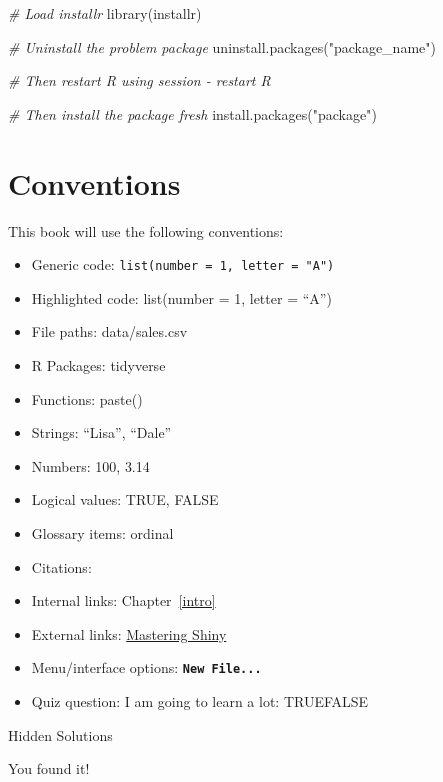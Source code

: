 \documentclass[
  oneside]{book}
\newenvironment{Shaded}{\begin{snugshade}}{\end{snugshade}}
\newcommand{\CommentTok}[1]{\textcolor[rgb]{0.56,0.35,0.01}{\textit{#1}}}
\newcommand{\FunctionTok}[1]{\textcolor[rgb]{0.00,0.00,0.00}{#1}}
\newcommand{\NormalTok}[1]{#1}
\newcommand{\StringTok}[1]{\textcolor[rgb]{0.31,0.60,0.02}{#1}}
\providecommand{\tightlist}{%
  \setlength{\itemsep}{0pt}\setlength{\parskip}{0pt}}
\begin{document}
\begin{Shaded}
\begin{Highlighting}[]
\CommentTok{\# Load installr}
\FunctionTok{library}\NormalTok{(installr)}

\CommentTok{\# Uninstall the problem package}
\FunctionTok{uninstall.packages}\NormalTok{(}\StringTok{"package\_name"}\NormalTok{)}

\CommentTok{\# Then restart R using session {-} restart R}

\CommentTok{\# Then install the package fresh}
\FunctionTok{install.packages}\NormalTok{(}\StringTok{"package"}\NormalTok{)}
\end{Highlighting}
\end{Shaded}

\hypertarget{conventions}{%
\chapter{Conventions}\label{conventions}}

This book will use the following conventions:

\begin{itemize}
\tightlist
\item
  Generic code: \texttt{list(number\ =\ 1,\ letter\ =\ "A")}
\item
  Highlighted code: {list}{(}number {=} {1}, letter {=} {``A''}{)}
\item
  File paths: data/sales.csv
\item
  R Packages: tidyverse
\item
  Functions: {paste}{(}{)}
\item
  Strings: {``Lisa''}, {``Dale''}
\item
  Numbers: {100}, {3.14}
\item
  Logical values: {TRUE}, {FALSE}
\item
  Glossary items: ordinal
\item
  Citations: \citet{R-tidyverse}
\item
  Internal links: Chapter~\ref{intro}
\item
  External links: \href{https://mastering-shiny.org/}{Mastering Shiny}
\item
  Menu/interface options: \textbf{\texttt{New\ File...}}
\item
  Quiz question: I am going to learn a lot: TRUEFALSE
\end{itemize}

Hidden Solutions

You found it!
\end{document}
